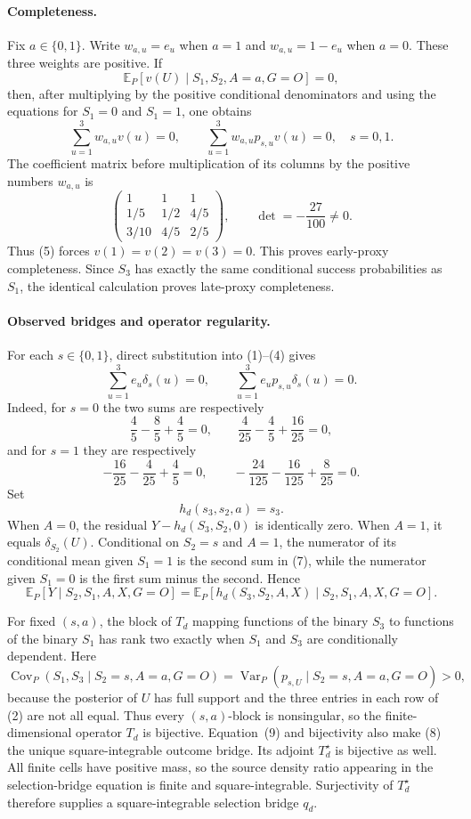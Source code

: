 \paragraph{Completeness.}
Fix \(a\in\{0,1\}\).  Write \(w_{a,u}=e_u\) when \(a=1\) and \(w_{a,u}=1-e_u\) when \(a=0\).  These three weights are positive.  If
\[
 \mathbb E_P[v(U)\mid S_1,S_2,A=a,G=O]=0,
\]
then, after multiplying by the positive conditional denominators and using the equations for \(S_1=0\) and \(S_1=1\), one obtains
\[
 \sum_{u=1}^3 w_{a,u}v(u)=0,
 \qquad
 \sum_{u=1}^3 w_{a,u}p_{s,u}v(u)=0,
 \quad s=0,1.
 \tag{5}
\]
The coefficient matrix before multiplication of its columns by the positive numbers \(w_{a,u}\) is
\[
 \begin{pmatrix}
 1&1&1\\
 1/5&1/2&4/5\\
 3/10&4/5&2/5
 \end{pmatrix},
 \qquad
 \det=-\frac{27}{100}\ne0.
 \tag{6}
\]
Thus (5) forces \(v(1)=v(2)=v(3)=0\).  This proves early-proxy completeness.  Since \(S_3\) has exactly the same conditional success probabilities as \(S_1\), the identical calculation proves late-proxy completeness.

\paragraph{Observed bridges and operator regularity.}
For each \(s\in\{0,1\}\), direct substitution into (1)--(4) gives
\[
 \sum_{u=1}^3 e_u\delta_s(u)=0,
 \qquad
 \sum_{u=1}^3 e_up_{s,u}\delta_s(u)=0.
 \tag{7}
\]
Indeed, for \(s=0\) the two sums are respectively
\[
 \frac45-\frac85+\frac45=0,
 \qquad
 \frac4{25}-\frac45+\frac{16}{25}=0,
\]
and for \(s=1\) they are respectively
\[
 -\frac{16}{25}-\frac4{25}+\frac45=0,
 \qquad
 -\frac{24}{125}-\frac{16}{125}+\frac8{25}=0.
\]
Set
\[
 h_d(s_3,s_2,a)=s_3.
 \tag{8}
\]
When \(A=0\), the residual \(Y-h_d(S_3,S_2,0)\) is identically zero.  When \(A=1\), it equals \(\delta_{S_2}(U)\).  Conditional on \(S_2=s\) and \(A=1\), the numerator of its conditional mean given \(S_1=1\) is the second sum in (7), while the numerator given \(S_1=0\) is the first sum minus the second.  Hence
\[
 \mathbb E_P[Y\mid S_2,S_1,A,X,G=O]
 =\mathbb E_P[h_d(S_3,S_2,A,X)\mid S_2,S_1,A,X,G=O].
 \tag{9}
\]

For fixed \((s,a)\), the block of \(T_d\) mapping functions of the binary \(S_3\) to functions of the binary \(S_1\) has rank two exactly when \(S_1\) and \(S_3\) are conditionally dependent.  Here
\[
 \operatorname{Cov}_P(S_1,S_3\mid S_2=s,A=a,G=O)
 =\operatorname{Var}_P(p_{s,U}\mid S_2=s,A=a,G=O)>0,
 \tag{10}
\]
because the posterior of \(U\) has full support and the three entries in each row of (2) are not all equal.  Thus every \((s,a)\)-block is nonsingular, so the finite-dimensional operator \(T_d\) is bijective.  Equation~(9) and bijectivity also make (8) the unique square-integrable outcome bridge.  Its adjoint \(T_d^\star\) is bijective as well.  All finite cells have positive mass, so the source density ratio appearing in the selection-bridge equation is finite and square-integrable.  Surjectivity of \(T_d^\star\) therefore supplies a square-integrable selection bridge \(q_d\).

